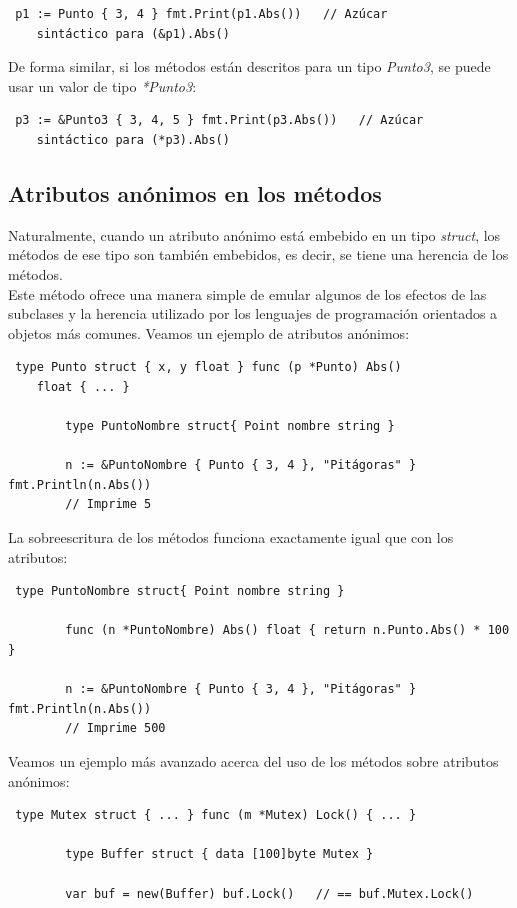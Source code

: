 	\begin{verbatim} p1 := Punto { 3, 4 } fmt.Print(p1.Abs())   // Azúcar
	sintáctico para (&p1).Abs() \end{verbatim}

	De forma similar, si los métodos están descritos para un tipo
	\textit{Punto3}, se puede usar un valor de tipo \textit{*Punto3}:

	\begin{verbatim} p3 := &Punto3 { 3, 4, 5 } fmt.Print(p3.Abs())   // Azúcar
	sintáctico para (*p3).Abs() \end{verbatim}

	\subsection{Atributos anónimos en los métodos}

	Naturalmente, cuando un atributo anónimo está embebido en un tipo
	\textit{struct}, los métodos de ese tipo son también embebidos, es decir, se
	tiene una herencia de los métodos.\\

	Este método ofrece una manera simple de emular algunos de los efectos de las
	subclases y la herencia utilizado por los lenguajes de programación
	orientados a objetos más comunes. Veamos un ejemplo de atributos anónimos:

	\begin{verbatim} type Punto struct { x, y float } func (p *Punto) Abs()
	float { ... }
    
		type PuntoNombre struct{ Point nombre string }
    
		n := &PuntoNombre { Punto { 3, 4 }, "Pitágoras" } fmt.Println(n.Abs())
		// Imprime 5 \end{verbatim}

	La sobreescritura de los métodos funciona exactamente igual que con los
	atributos:

	\begin{verbatim} type PuntoNombre struct{ Point nombre string }
    
		func (n *PuntoNombre) Abs() float { return n.Punto.Abs() * 100 }
    
		n := &PuntoNombre { Punto { 3, 4 }, "Pitágoras" } fmt.Println(n.Abs())
		// Imprime 500 \end{verbatim}

	Veamos un ejemplo más avanzado acerca del uso de los métodos sobre atributos
	anónimos:

	\begin{verbatim} type Mutex struct { ... } func (m *Mutex) Lock() { ... }
	    
		type Buffer struct { data [100]byte Mutex }
    
		var buf = new(Buffer) buf.Lock()   // == buf.Mutex.Lock() \end{verbatim}

